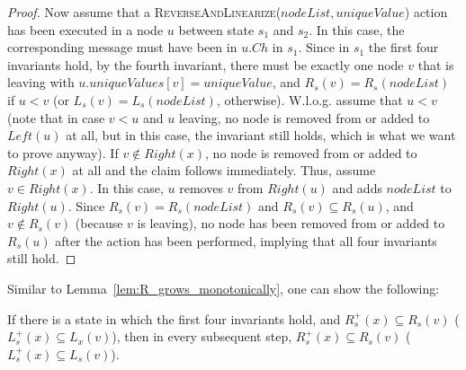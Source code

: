 \documentclass[a4paper,USenglish]{lipics}
\newcommand{\rsp}{\ensuremath{R_s^+}\xspace}
\newcommand{\lsp}{\ensuremath{L_s^+}\xspace}
\newcommand{\revandlin}[1]{\textsc{ReverseAndLinearize(\ensuremath{#1})}\xspace} \newcommand{\revandlinREQ}[1]{\textsc{ReverseAndLinearizeREQ(#1)}\xspace}
\begin{document}
\begin{proof}
    Now assume that a \revandlin{nodeList, uniqueValue} action has been executed in a node $u$ between state $s_1$ and $s_2$.
    In this case, the corresponding message must have been in $u.Ch$ in $s_1$.
 Since in $s_1$ the first four invariants hold, by the fourth invariant, there must be exactly one node $v$ that is leaving with $u.uniqueValues[v] = uniqueValue$, and $R_s(v) = R_s(nodeList)$ if $u < v$ (or $L_s(v) = L_s(nodeList)$, otherwise).
 W.l.o.g. assume that $u < v$ (note that in case $v < u$ and $u$ leaving, no node is removed from or added to $Left(u)$ at all, but in this case, the invariant still holds, which is what we want to prove anyway).
 If $v \notin Right(x)$, no node is removed from or added to $Right(x)$ at all and the claim follows immediately.
 Thus, assume $v \in Right(x)$.
 In this case, $u$ removes $v$ from $Right(u)$ and adds $nodeList$ to $Right(u)$.
 Since $R_s(v) = R_s(nodeList)$ and $R_s(v) \subseteq R_s(u)$, and $v \notin R_s(v)$ (because $v$ is leaving), no node has been removed from or added to $R_s(u)$ after the action has been performed, implying that all four invariants still hold.  
\end{proof}
Similar to Lemma~\ref{lem:R_grows_monotonically}, one can show the following:
\begin{lemma}\label{lem:blpp_Rs_grows_monotonically}
  If there is a state in which the first four invariants hold, and $\rsp(x) \subseteq R_s(v)$ ($\lsp(x) \subseteq L_x(v)$), then in every subsequent step, $\rsp(x) \subseteq R_s(v)$ ($\lsp(x) \subseteq L_s(v)$).
\end{lemma}
\end{document}
